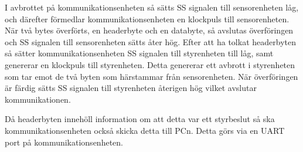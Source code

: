 I avbrottet på kommunikationsenheten så sätts SS signalen till sensorenheten låg, och därefter förmedlar kommunikationsenheten en klockpuls till sensorenheten. När två bytes överförts, en headerbyte och en databyte, så avslutas överföringen och SS signalen till sensorenheten sätts åter hög. Efter att ha tolkat headerbyten så sätter kommunikationsenheten SS signalen till styrenheten till låg, samt genererar en klockpuls till styrenheten. Detta genererar ett avbrott i styrenheten som tar emot de två byten som härstammar från sensorenheten. När överföringen är färdig sätts SS signalen till styrenheten återigen hög vilket avslutar kommunikationen. 

Då headerbyten innehöll information om att detta var ett styrbeslut så ska kommunikationsenheten också skicka detta till PCn. Detta görs via en UART port på kommunikationsenheten.








